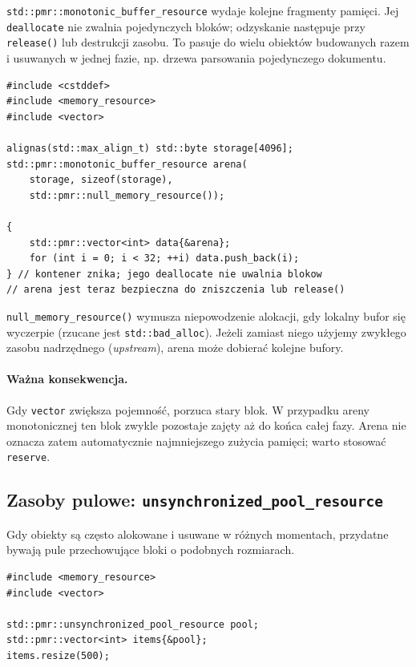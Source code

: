 \texttt{std::pmr::monotonic\_buffer\_resource} wydaje kolejne
fragmenty pamięci. Jej \texttt{deallocate} nie zwalnia pojedynczych
bloków; odzyskanie następuje przy \texttt{release()} lub destrukcji
zasobu. To pasuje do wielu obiektów budowanych razem i usuwanych
w jednej fazie, np. drzewa parsowania pojedynczego dokumentu.

\begin{lstlisting}
#include <cstddef>
#include <memory_resource>
#include <vector>

alignas(std::max_align_t) std::byte storage[4096];
std::pmr::monotonic_buffer_resource arena(
    storage, sizeof(storage),
    std::pmr::null_memory_resource());

{
    std::pmr::vector<int> data{&arena};
    for (int i = 0; i < 32; ++i) data.push_back(i);
} // kontener znika; jego deallocate nie uwalnia blokow
// arena jest teraz bezpieczna do zniszczenia lub release()
\end{lstlisting}

\texttt{null\_memory\_resource()} wymusza niepowodzenie alokacji,
gdy lokalny bufor się wyczerpie (rzucane jest \texttt{std::bad\_alloc}).
Jeżeli zamiast niego użyjemy zwykłego zasobu nadrzędnego
(\emph{upstream}), arena może dobierać kolejne bufory.

\paragraph{Ważna konsekwencja.}
Gdy \texttt{vector} zwiększa pojemność, porzuca stary blok.
W przypadku areny monotonicznej ten blok zwykle pozostaje zajęty
aż do końca całej fazy. Arena nie oznacza zatem automatycznie
najmniejszego zużycia pamięci; warto stosować \texttt{reserve}.

\subsection{Zasoby pulowe: \texttt{unsynchronized\_pool\_resource}}

Gdy obiekty są często alokowane i usuwane w różnych momentach,
przydatne bywają pule przechowujące bloki o podobnych rozmiarach.

\begin{lstlisting}
#include <memory_resource>
#include <vector>

std::pmr::unsynchronized_pool_resource pool;
std::pmr::vector<int> items{&pool};
items.resize(500);
\end{lstlisting}

